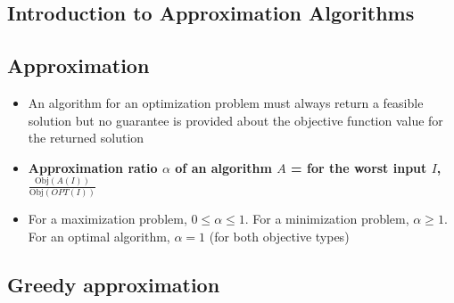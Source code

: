 \documentclass[20pt,a4paper,landscape]{extarticle}
\newcommand{\Obj}{\textrm{Obj}}
\begin{document}
\tableofcontents
\clearpage
\begin{flushleft}
\section{Introduction to Approximation Algorithms}
\subsection{Approximation}
\begin{itemize}
\item An algorithm for an optimization problem must always return a feasible solution but no guarantee is provided about the objective function value for the returned solution
\item \textbf{Approximation ratio $\alpha$ of an algorithm $A$ = for the worst input $I$, $\frac{\Obj(A(I))}{\Obj(OPT(I))}$}
\item For a maximization problem, $0 \leq \alpha \leq 1$. For a minimization problem, $\alpha \geq 1$. For an optimal algorithm, $\alpha = 1$ (for both objective types)
\end{itemize}
\subsection{Greedy approximation}

\end{flushleft}
\end{document}
